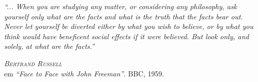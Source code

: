 
\begin{epigrafe} %

\hypertarget{estilo:epigrafe}{} %
 
\textit{\large``... When you are studying any matter, or considering any philosophy, ask yourself only what are the facts and what is the truth that the facts bear out. Never let yourself be diverted either by what you wish to believe, or by what you think would have beneficent social effects if it were believed. But look only, and solely, at what are the facts.''}

\vspace{1cm}

\hspace{4cm} \emph{\textsc{Bertrand Russell}}\\\hspace{4cm} em \textsl{``Face to Face with John Freeman''}. BBC, 1959.

\end{epigrafe}